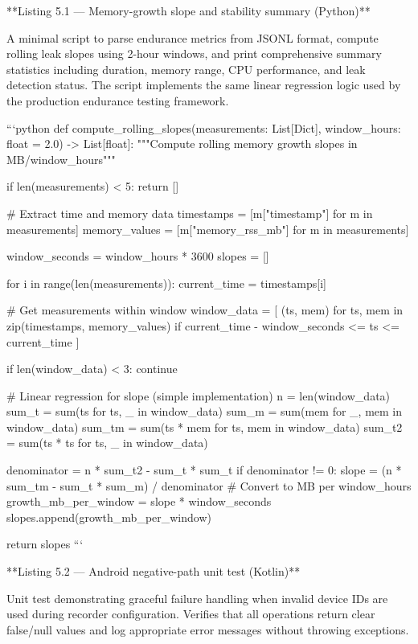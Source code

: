 \documentclass[12pt,a4paper]{article}
\begin{document}
{**Listing 5.1 — Memory-growth slope and stability summary (Python)**

A minimal script to parse endurance metrics from JSONL format, compute rolling leak slopes using 2-hour windows, and print comprehensive summary statistics including duration, memory range, CPU performance, and leak detection status. The script implements the same linear regression logic used by the production endurance testing framework.

```python
def compute_rolling_slopes(measurements: List[Dict], window_hours: float = 2.0) -> List[float]:
    """Compute rolling memory growth slopes in MB/window_hours"""
    
    if len(measurements) < 5:
        return []
    
    # Extract time and memory data
    timestamps = [m["timestamp"] for m in measurements]
    memory_values = [m["memory_rss_mb"] for m in measurements]
    
    window_seconds = window_hours * 3600
    slopes = []
    
    for i in range(len(measurements)):
        current_time = timestamps[i]
        
        # Get measurements within window
        window_data = [
            (ts, mem) for ts, mem in zip(timestamps, memory_values)
            if current_time - window_seconds <= ts <= current_time
        ]
        
        if len(window_data) < 3:
            continue
            
        # Linear regression for slope (simple implementation)
        n = len(window_data)
        sum_t = sum(ts for ts, _ in window_data)
        sum_m = sum(mem for _, mem in window_data)
        sum_tm = sum(ts * mem for ts, mem in window_data)
        sum_t2 = sum(ts * ts for ts, _ in window_data)
        
        denominator = n * sum_t2 - sum_t * sum_t
        if denominator != 0:
            slope = (n * sum_tm - sum_t * sum_m) / denominator
            # Convert to MB per window_hours
            growth_mb_per_window = slope * window_seconds
            slopes.append(growth_mb_per_window)
    
    return slopes
```

**Listing 5.2 — Android negative-path unit test (Kotlin)**

Unit test demonstrating graceful failure handling when invalid device IDs are used during recorder configuration. Verifies that all operations return clear false/null values and log appropriate error messages without throwing exceptions.

}
\end{document}
